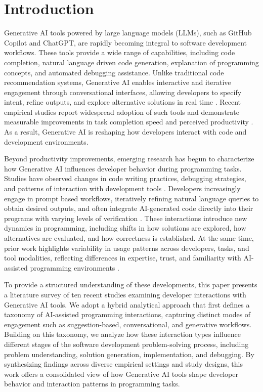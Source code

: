 \section{Introduction}
Generative AI tools powered by large language models (LLMs), such as GitHub Copilot and ChatGPT, are rapidly becoming integral to software development workflows. These tools provide a wide range of capabilities, including code completion, natural language driven code generation, explanation of programming concepts, and automated debugging assistance. Unlike traditional code recommendation systems, Generative AI enables interactive and iterative engagement through conversational interfaces, allowing developers to specify intent, refine outputs, and explore alternative solutions in real time \cite{vaithilingam2022expectation, barke2022grounded}. Recent empirical studies report widespread adoption of such tools and demonstrate measurable improvements in task completion speed and perceived productivity \cite{peng2023copilot, bird2023copilot}. As a result, Generative AI is reshaping how developers interact with code and development environments.

Beyond productivity improvements, emerging research has begun to characterize how Generative AI influences developer behavior during programming tasks. Studies have observed changes in code writing practices, debugging strategies, and patterns of interaction with development tools \cite{barke2022grounded, mao2026empirical}. Developers increasingly engage in prompt based workflows, iteratively refining natural language queries to obtain desired outputs, and often integrate AI-generated code directly into their programs with varying levels of verification \cite{vaithilingam2022expectation, kazemitabaar2023copilot}. These interactions introduce new dynamics in programming, including shifts in how solutions are explored, how alternatives are evaluated, and how correctness is established. At the same time, prior work highlights variability in usage patterns across developers, tasks, and tool modalities, reflecting differences in expertise, trust, and familiarity with AI-assisted programming environments \cite{kazemitabaar2023copilot, mao2026empirical}.

To provide a structured understanding of these developments, this paper presents a literature survey of ten recent studies examining developer interactions with Generative AI tools. We adopt a hybrid analytical approach that first defines a taxonomy of AI-assisted programming interactions, capturing distinct modes of engagement such as suggestion-based, conversational, and generative workflows. Building on this taxonomy, we analyze how these interaction types influence different stages of the software development problem-solving process, including problem understanding, solution generation, implementation, and debugging. By synthesizing findings across diverse empirical settings and study designs, this work offers a consolidated view of how Generative AI tools shape developer behavior and interaction patterns in programming tasks.

